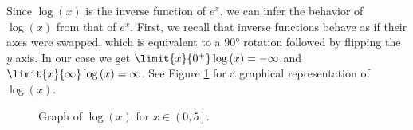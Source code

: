 \begin{enumerate}
{\begin{answer}
											Since $\log\left( x \right)$ is the inverse function of $e^{x}$, we can infer the behavior of $\log\left( x \right)$ from that of $e^{x}$. First, we recall that inverse functions behave as if their axes were swapped, which is equivalent to a $\ang{90}$ rotation followed by flipping the $y$ axis. In our case we get $\limit{x}{0^{+}}\log\left( x \right)=-\infty$ and $\limit{x}{ \infty}\log\left( x \right)=\infty$. See Figure \ref{fig:log} for a graphical representation of $\log\left( x \right)$.
											\begin{figure}[H]
												\centering
												\caption{Graph of $\log\left( x \right)$ for $x\in\left( 0, 5\right]$.}
												\label{fig:log}
											\end{figure}
										\end{answer}
									}\fi
\end{enumerate}
